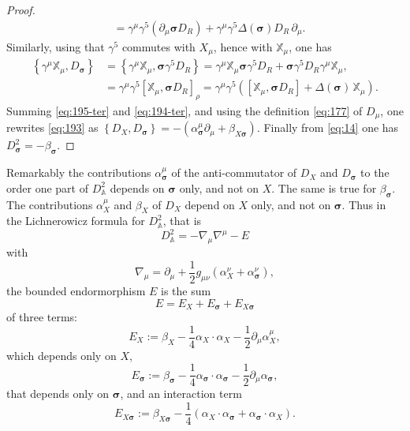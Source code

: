 \documentclass[11pt]{article}
\newcommand{\sig}{{\boldsymbol{\sigma}}}
\newcommand{\XX}{{\mathbb X}}
\newcommand{\del}{\partial}
\begin{document}
\begin{proof}
\begin{align}
& =\gamma^\mu\gamma^5 \left(\del_\mu\sig D_R\right)+ \gamma^\mu \gamma^5\Delta(\sig) D_R\,\del_\mu.
\label{eq:194-ter}\end{align}
Similarly, using that $\gamma^5$ commutes with $X_\mu$, hence with
$\mathbb X_\mu$, one has
\begin{align}
  \label{eq:195}
  \left\{\gamma^\mu \XX_\mu,
    D_\sig\right\} &=  \left\{\gamma^\mu \XX_\mu,
    \sig\gamma^5 D_R\right\}
 = \gamma^\mu \XX_\mu
    \sig\gamma^5 D_R + \sig\gamma^5 D_R\gamma^\mu
    \XX_\mu,\\
&= \gamma^\mu\gamma^5 [\XX_\mu, \sig  D_R]_\rho
= \gamma^\mu\gamma^5\left( [\XX_\mu, \sig  D_R] +
  \Delta(\sig)\,\XX_\mu\right).
\label{eq:195-ter}
\end{align}
Summing \eqref{eq:195-ter} and \eqref{eq:194-ter}, and using the
definition \eqref{eq:177} of $D_\mu$, one rewrites \eqref{eq:193} as 
$\left\{D_X, D_\sig\right\} = -(\alpha^\mu_{\sig}\del_\mu +
\beta_{X\sig})$.
Finally from \eqref{eq:14} one has $D_\sig^2 =-\beta_\sig$.
\end{proof}
Remarkably the contributions $\alpha_{\sig}^\mu$  of the
anti-commutator of $D_X$ and $D_\sig$ to the order one part of
$D_{\mathbb A}^2$ depends on $\sig$ only, and not on $X$. The
same is true for $\beta_\sig$. The contributions
$\alpha_X^\mu$ and $\beta_X$ of $D_X$ depend on $X$ only, and not on
$\sig$. Thus in the Lichnerowicz formula for
$D_{\mathbb A}^2$, that is
\begin{equation}
  \label{eq:173}
  D_{\mathbb A}^2 = -\nabla_\mu\nabla^\mu -E
\end{equation}
with
\begin{equation}
  \label{eq:174}
  \nabla_\mu = \del_\mu + \frac 12g_{\mu\nu} (\alpha_X^\nu+\alpha_{\sig}^\nu),
\end{equation}
the bounded endormorphism $E$ is the sum 
 \begin{equation}
   \label{eq:70}
   E = E_X + E_\sig + E_{X\sig}
 \end{equation}
 of three terms:
 \begin{equation}
 E_X := \beta_X - \frac 14 \alpha_X \cdot \alpha_X - \frac 12 \del_\mu \alpha_X^\mu,
 \label{eq:73}
 \end{equation}
which depends only on $X$,
\begin{equation}
\label{eq:73-1}
E_\sig := \beta_\sig - \frac 14\alpha_{\sig}\cdot \alpha_{\sig} -
\frac 12 \del_\mu \alpha_{\sig},
  \end{equation}
that depends only on $\sig$,  and an interaction term
\begin{equation}
  \label{eq:72}
  E_{X\sig}:= \beta_{X\sig} -  \frac 14\left(\alpha_X\cdot
    \alpha_{\sig} + \alpha_{\sig}\cdot \alpha_X\right). 
\end{equation}
\end{document}
